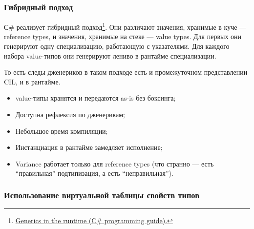 \subsubsection{Гибридный подход} \label{subsubsec:hybrid}

С\# реализует гибридный подход\footnote{\href{https://learn.microsoft.com/en-us/dotnet/csharp/programming-guide/generics/generics-in-the-run-time}{Generics in the runtime (C\# programming guide).}}.
Они различают значения, хранимые в куче --- reference types, и значения, хранимые на стеке --- value types.
Для первых они генерируют одну специализацию, работающую с указателями.
Для каждого набора value-типов они генерируют лениво в рантайме специализации.

То есть следы дженериков в таком подходе есть и промежуточном представлении CIL, и в рантайме.

\begin{itemize}
    \item[\positive] value-типы хранятся и передаются as-is без боксинга;
    \item[\positive] Доступна рефлексия по дженерикам;
    \item[\positive] Небольшое время компиляции;
    \item[\negative] Инстанциация в рантайме замедляет исполнение;
    \item[\negative] Variance работает только для reference types (что странно --- есть ``правильная'' подтипизация, а есть ``неправильная'').
\end{itemize}

\subsubsection{Использование виртуальной таблицы свойств типов} \label{subsubsec:swift-generics}

